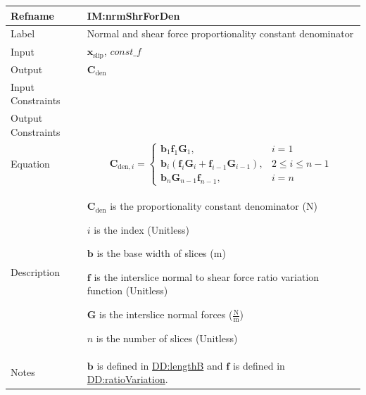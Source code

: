 \documentclass[12pt]{article}
\begin{document}
\medskip
\noindent
\begin{minipage}{\textwidth}
\begin{tabular}{>{\raggedright}p{}>{\raggedright\arraybackslash}p{}}
\toprule \textbf{Refname} & \textbf{IM:nrmShrForDen}
\label{IM:nrmShrForDen}
\\ \midrule
Label & Normal and shear force proportionality constant denominator
        
\\ \midrule
Input & ${\symbf{x}_{\text{slip}}}$, $\mathit{const\_f}$
        
\\ \midrule
Output & ${\symbf{C}_{\text{den}}}$
         
\\ \midrule
Input Constraints & 
\\ \midrule
Output Constraints & 
\\ \midrule
Equation & \begin{displaymath}
           {\symbf{C}_{\text{den},i}}=\begin{cases}
                                      {\symbf{b}}_{1} {\symbf{f}}_{1} {\symbf{G}}_{1}, & i=1\\
                                      {\symbf{b}}_{i} \left({\symbf{f}}_{i} {\symbf{G}}_{i}+{\symbf{f}}_{i-1} {\symbf{G}}_{i-1}\right), & 2\leq{}i\leq{}n-1\\
                                      {\symbf{b}}_{n} {\symbf{G}}_{n-1} {\symbf{f}}_{n-1}, & i=n
                                      \end{cases}
           \end{displaymath}
\\ \midrule
Description & \begin{symbDescription}
              \item{${\symbf{C}_{\text{den}}}$ is the proportionality constant denominator (${\text{N}}$)}
              \item{$i$ is the index (Unitless)}
              \item{$\symbf{b}$ is the base width of slices (${\text{m}}$)}
              \item{$\symbf{f}$ is the interslice normal to shear force ratio variation function (Unitless)}
              \item{$\symbf{G}$ is the interslice normal forces ($\frac{\text{N}}{\text{m}}$)}
              \item{$n$ is the number of slices (Unitless)}
              \end{symbDescription}
\\ \midrule
Notes & $\symbf{b}$ is defined in \hyperref[DD:lengthB]{DD:lengthB} and $\symbf{f}$ is defined in \hyperref[DD:ratioVariation]{DD:ratioVariation}.
        

\end{tabular}
\end{minipage}
\end{document}
